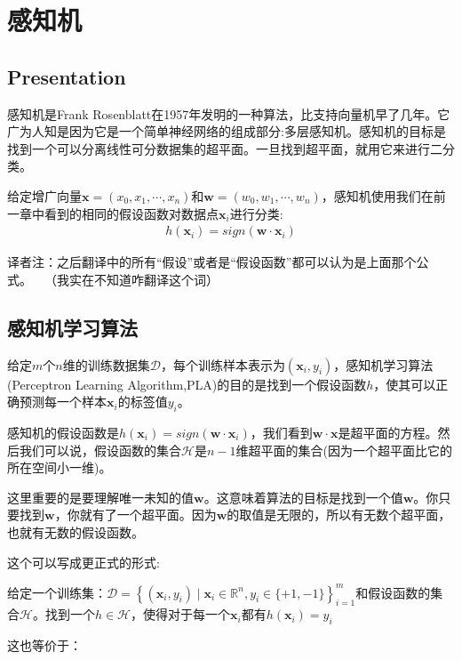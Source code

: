 \chapter{感知机}

\section{Presentation}

感知机是Frank Rosenblatt在1957年发明的一种算法，比支持向量机早了几年。它广为人知是因为它是一个简单神经网络的组成部分:多层感知机。感知机的目标是找到一个可以分离线性可分数据集的超平面。一旦找到超平面，就用它来进行二分类。

给定增广向量$\mathbf{x}=(x_0,x_1,\cdots,x_n)$和$\mathbf{w}=(w_0,w_1,\cdots,w_n)$，感知机使用我们在前一章中看到的相同的假设函数对数据点$\mathbf{x}_i$进行分类:
\begin{gather*}
h(\mathbf{x}_i) = sign(\mathbf{w}\cdot\mathbf{x}_i)
\end{gather*}

译者注：之后翻译中的所有“假设”或者是“假设函数”都可以认为是上面那个公式。~~（我实在不知道咋翻译这个词）~~

\section{感知机学习算法}

给定$m$个$n$维的训练数据集$\mathcal{D}$，每个训练样本表示为$(\mathbf{x}_i,y_i)$，感知机学习算法(Perceptron Learning Algorithm,PLA)的目的是找到一个假设函数$h$，使其可以正确预测每一个样本$\mathbf{x}_i$的标签值$y_i$。

感知机的假设函数是$h(\mathbf{x}_i) = sign(\mathbf{w}\cdot\mathbf{x}_i)$，我们看到$\mathbf{w}\cdot\mathbf{x}$是超平面的方程。然后我们可以说，假设函数的集合$\mathcal{H}$是$n-1$维超平面的集合(因为一个超平面比它的所在空间小一维)。

这里重要的是要理解唯一未知的值$\mathbf{w}$。这意味着算法的目标是找到一个值$\mathbf{w}$。你只要找到$\mathbf{w}$，你就有了一个超平面。因为$\mathbf{w}$的取值是无限的，所以有无数个超平面，也就有无数的假设函数。

这个可以写成更正式的形式:

给定一个训练集：$\mathcal{D}=\left\{(\mathbf{x}_i,y_i)\mid \mathbf{x}_i \in \mathbb{R}^n,y_i \in \{+1,-1\}  \right\}_{i=1}^m$和假设函数的集合$\mathcal{H}$。找到一个$h \in \mathcal{H}$，使得对于每一个$\mathbf{x}_i$都有$h(\mathbf{x}_i)=y_i$

这也等价于：


